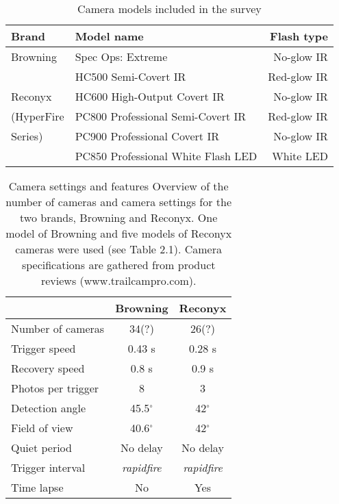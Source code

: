 

\begin{table}[h]
\caption{Camera models included in the survey}
\label{tab:cam_mod}
\centering

\begin{tabular}{llr}
\hline
Brand  & Model name & Flash type  \\
\hline 
Browning	& Spec Ops: Extreme 					& No-glow IR \\
			& HC500 Semi-Covert IR					& Red-glow IR \\
Reconyx		& HC600 High-Output Covert IR			& No-glow IR  \\
(HyperFire 	& PC800 Professional Semi-Covert IR 	& Red-glow IR \\
Series) 		& PC900 Professional Covert IR 			& No-glow IR  \\
    		& PC850 Professional White Flash LED	& White LED  \\
\hline
\end{tabular}
\end{table}


\begin{table}[h]
\caption[Camera settings and features]
{Camera settings and features %
Overview of the number of cameras and camera settings for the two brands, Browning and Reconyx. One model of Browning and five models of Reconyx cameras were used (see Table 2.1). Camera specifications are gathered from product reviews (www.trailcampro.com).}
\label{tab:cam_set}
\centering
\begin{tabular}{lcc}
\hline 
 & Browning & Reconyx \\ 
\hline 
Number of cameras 	& 34(?) 	& 26(?) \\  
Trigger speed 		& 0.43 s 	& 0.28 s \\ 
Recovery speed 		& 0.8 s 	& 0.9 s \\ 
Photos per trigger 	& 8 		& 3 \\  
Detection angle 	& 45.5$^{\circ}$ 	& 42$^{\circ}$ \\ 
Field of view 		& 40.6$^{\circ}$ 	& 42$^{\circ}$ \\  
Quiet period 		& No delay 	& No delay \\ 
Trigger interval	& \emph{rapidfire} & \emph{rapidfire} \\
Time lapse			& No	 	& Yes \\
\hline 
\end{tabular} 
\end{table}




